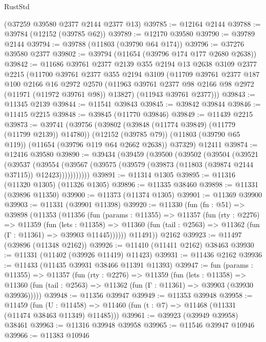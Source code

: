 \begin{lexlean}{RustStd}
\begin{coremodule}
    (@37259 @39580 @2377 @2144 @2377 @13)
@39785 := @12164 @2144
@39788 := @39784 (@12152 (@39785 @62))
@39789 := @12170 @39580
@39790 := @39789 @2144
@39794 := @39788 (@11803 (@39790 @64 @174))
@39796 := @37276 @39580 @2377
@39802 := @39794 (@11654 (@39796 @174 @177 @2680 @2638))
@39842 := @11686
    @39761
    @2377
    @2139
    @355
    @2194
    @13
    @2638
    @3109
    @2377
    @2215
    (@11700
      @39761
      @2377
      @355
      @2194
      @3109
      (@11709
        @39761
        @2377
        @187
        @100
        @2166
        @16
        @2972
        @2570
        (@11963 @39761 @2377 @98 @2166 @98 @2972 (@11971 (@11972 @39761 @98)) @13827)
        (@11943 @39761 @2377)))
@39843 := @11345 @2139
@39844 := @11541 @39843
@39845 := @39842 @39844
@39846 := @11415 @2215
@39848 := @39845 (@11770 @39846)
@39849 := @11439 @2215
@39873 := @39741
    (@39756
      (@39802 (@39848 (@11774 @39849) (@11779 (@11799 @2139)) @14780))
      (@12152 (@39785 @79))
      (@11803 (@39790 @65 @119))
      (@11654 (@39796 @119 @64 @2662 @2638))
      @37329)
    @12411
@39874 := @12416 @39580
@39890 := @39434
    (@39459
      (@39500
        (@39502
          (@39504
            (@39521
              (@39537
                (@39554
                  (@39567 (@39575 (@39579 (@39873 (@11803 (@39874 @2144 @37115)) @12423)))))))))))
@39891 := @11314 @1305
@39895 := @11316 (@11320 @1305) (@11326 @1305)
@39896 := @11335 @38460
@39898 := @11331 (@39896 @11350)
@39900 := @11373 (@11374 @1305)
@39901 := @11369 @39900
@39903 := @11331 (@39901 @11398)
@39920 := @11330
    (fun (fn : @51) =>
    @39898
      (@11353
        (@11356
          (fun (params : @11355) =>
          @11357
            (fun (rty : @2276) =>
            @11359
              (fun (lets : @11358) =>
              @11360 (fun (tail : @2563) => @11362 (fun (Γ : @11361) => @39903 @11445))))))
        @11491))
    @2162
@39923 := @11497 (@39896 (@11348 @2162))
@39926 := @11410 (@11411 @2162) @38463
@39930 := @11331 (@11402 (@39926 @11419) @11423)
@39931 := @11436 @2162
@39936 := @11433 (@11435 @39931 @38466 @11391 @11393)
@39947 := fun (params : @11355) =>
  @11357
    (fun (rty : @2276) =>
    @11359
      (fun (lets : @11358) =>
      @11360 (fun (tail : @2563) => @11362 (fun (Γ : @11361) => @39903 (@39930 @39936)))))
@39948 := @11356 @39947
@39949 := @11353 @39948
@39958 := @11459
    (fun (U : @11458) => @11460 (fun (t : @7) => @11468 (@11331 (@11474 @38463 @11349) @11485)))
@39961 := @39923 (@39949 @39958) @38461
@39963 := @11316 @39948 @39958
@39965 := @11546 @39947 @10946
@39966 := @11383 @10946

\end{coremodule}
\end{lexlean}
